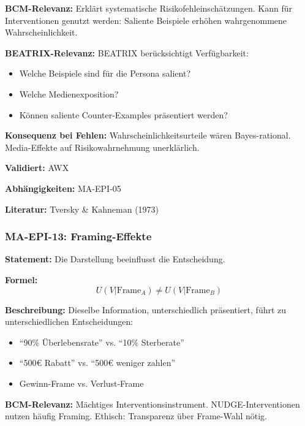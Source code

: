 \textbf{BCM-Relevanz:}
Erklärt systematische Risikofehleinschätzungen. Kann für Interventionen genutzt werden: Saliente Beispiele erhöhen wahrgenommene Wahrscheinlichkeit.

\textbf{BEATRIX-Relevanz:}
BEATRIX berücksichtigt Verfügbarkeit:
\begin{itemize}
    \item Welche Beispiele sind für die Persona salient?
    \item Welche Medienexposition?
    \item Können saliente Counter-Examples präsentiert werden?
\end{itemize}

\textbf{Konsequenz bei Fehlen:}
Wahrscheinlichkeitsurteile wären Bayes-rational. Media-Effekte auf Risikowahrnehmung unerklärlich.

\textbf{Validiert:} AWX

\textbf{Abhängigkeiten:} MA-EPI-05

\textbf{Literatur:} Tversky \& Kahneman (1973)


\subsubsection*{MA-EPI-13: Framing-Effekte}

\textbf{Statement:} Die Darstellung beeinflusst die Entscheidung.

\textbf{Formel:}
\begin{equation}
U(V|\text{Frame}_A) \neq U(V|\text{Frame}_B)
\end{equation}

\textbf{Beschreibung:}
Dieselbe Information, unterschiedlich präsentiert, führt zu unterschiedlichen Entscheidungen:
\begin{itemize}
    \item ``90\% Überlebensrate'' vs. ``10\% Sterberate''
    \item ``500€ Rabatt'' vs. ``500€ weniger zahlen''
    \item Gewinn-Frame vs. Verlust-Frame
\end{itemize}

\textbf{BCM-Relevanz:}
Mächtiges Interventionsinstrument. NUDGE-Interventionen nutzen häufig Framing. Ethisch: Transparenz über Frame-Wahl nötig.

